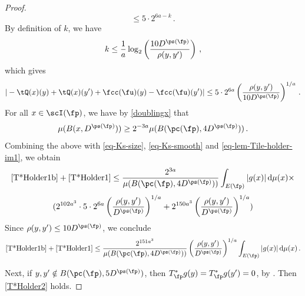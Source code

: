 \begin{proof}
        $$
            \le 5 \cdot 2^{6a - k}\,.
        $$
        By definition of $k$, we have
        $$
            k \le \frac{1}{a} \log_2\left(\frac{10 D^{\ps(\fp)}}{\rho(y,y')}\right)\,,
        $$
        which gives
      \begin{equation}
            \label{eq-lem-Tile-holder-im1}
             |-\tQ(x)(y) + \tQ(x)(y') + \fcc(\fu)(y) - \fcc(\fu)(y')| \le 5 \cdot 2^{6a} \left(\frac{\rho(y,y')}{10 D^{\ps(\fp)}}\right)^{1/a}\,.
        \end{equation}
        For all $x \in \scI(\fp)$, we have by \eqref{doublingx} that
        $$
            \mu(B(x, D^{\ps(\fp)})) \ge 2^{-3a} \mu(B(\pc(\fp), 4D^{\ps(\fp)}))\,.
        $$
        Combining the above with \eqref{eq-Ks-size}, \eqref{eq-Ks-smooth} and \eqref{eq-lem-Tile-holder-im1},
        we obtain
        $$
            \eqref{T*Holder1b}+\eqref{T*Holder1} \le \frac{2^{3a}}{\mu(B(\pc(\fp), 4D^{\ps(\fp)}))} \int_{E(\fp)}|g(x)| \, \mathrm{d}\mu(x) \times
        $$
        $$
            (2^{102a^3} \cdot 5 \cdot 2^{6a} \left(\frac{\rho(y,y')}{ D^{\ps(\fp)}}\right)^{1/a} + 2^{150a^3} \left(\frac{\rho(y,y')}{D^{\ps(\fp)}}\right)^{1/a})
        $$
        Since $\rho(y,y') \le 10 D^{\ps(\fp)}$, we conclude
        $$
            \eqref{T*Holder1b}+\eqref{T*Holder1} \le \frac{2^{151a^3}}{\mu(B(\pc(\fp), 4D^{\ps(\fp)}))} \left(\frac{\rho(y,y')}{D^{\ps(\fp)}}\right)^{1/a} \int_{E(\fp)}|g(x)| \, \mathrm{d}\mu(x)\,.
        $$

        Next, if $y,y' \notin B(\pc(\fp), 5D^{\ps(\fp)})$, then $T_{\fp}^*g(y) = T_{\fp}^*g(y') = 0$, by . Then \eqref{T*Holder2} holds.


\end{proof}
